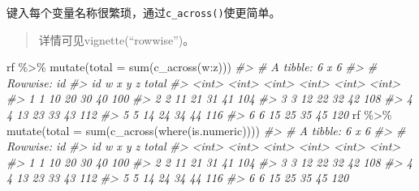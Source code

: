 \documentclass[
]{book}
\newenvironment{Shaded}{\begin{snugshade}}{\end{snugshade}}
\newcommand{\AttributeTok}[1]{\textcolor[rgb]{0.77,0.63,0.00}{#1}}
\newcommand{\CommentTok}[1]{\textcolor[rgb]{0.56,0.35,0.01}{\textit{#1}}}
\newcommand{\FunctionTok}[1]{\textcolor[rgb]{0.00,0.00,0.00}{#1}}
\newcommand{\NormalTok}[1]{#1}
\newcommand{\SpecialCharTok}[1]{\textcolor[rgb]{0.00,0.00,0.00}{#1}}
\begin{document}
键入每个变量名称很繁琐，通过\texttt{c\_across()}使更简单。

\begin{quote}
详情可见vignette(``rowwise'')。
\end{quote}

\begin{Shaded}
\begin{Highlighting}[]
\NormalTok{rf }\SpecialCharTok{\%\textgreater{}\%} \FunctionTok{mutate}\NormalTok{(}\AttributeTok{total =} \FunctionTok{sum}\NormalTok{(}\FunctionTok{c\_across}\NormalTok{(w}\SpecialCharTok{:}\NormalTok{z)))}
\CommentTok{\#\textgreater{} \# A tibble: 6 x 6}
\CommentTok{\#\textgreater{} \# Rowwise:  id}
\CommentTok{\#\textgreater{}      id     w     x     y     z total}
\CommentTok{\#\textgreater{}   \textless{}int\textgreater{} \textless{}int\textgreater{} \textless{}int\textgreater{} \textless{}int\textgreater{} \textless{}int\textgreater{} \textless{}int\textgreater{}}
\CommentTok{\#\textgreater{} 1     1    10    20    30    40   100}
\CommentTok{\#\textgreater{} 2     2    11    21    31    41   104}
\CommentTok{\#\textgreater{} 3     3    12    22    32    42   108}
\CommentTok{\#\textgreater{} 4     4    13    23    33    43   112}
\CommentTok{\#\textgreater{} 5     5    14    24    34    44   116}
\CommentTok{\#\textgreater{} 6     6    15    25    35    45   120}
\NormalTok{rf }\SpecialCharTok{\%\textgreater{}\%} \FunctionTok{mutate}\NormalTok{(}\AttributeTok{total =} \FunctionTok{sum}\NormalTok{(}\FunctionTok{c\_across}\NormalTok{(}\FunctionTok{where}\NormalTok{(is.numeric))))}
\CommentTok{\#\textgreater{} \# A tibble: 6 x 6}
\CommentTok{\#\textgreater{} \# Rowwise:  id}
\CommentTok{\#\textgreater{}      id     w     x     y     z total}
\CommentTok{\#\textgreater{}   \textless{}int\textgreater{} \textless{}int\textgreater{} \textless{}int\textgreater{} \textless{}int\textgreater{} \textless{}int\textgreater{} \textless{}int\textgreater{}}
\CommentTok{\#\textgreater{} 1     1    10    20    30    40   100}
\CommentTok{\#\textgreater{} 2     2    11    21    31    41   104}
\CommentTok{\#\textgreater{} 3     3    12    22    32    42   108}
\CommentTok{\#\textgreater{} 4     4    13    23    33    43   112}
\CommentTok{\#\textgreater{} 5     5    14    24    34    44   116}
\CommentTok{\#\textgreater{} 6     6    15    25    35    45   120}


\end{Highlighting}
\end{Shaded}
\end{document}

